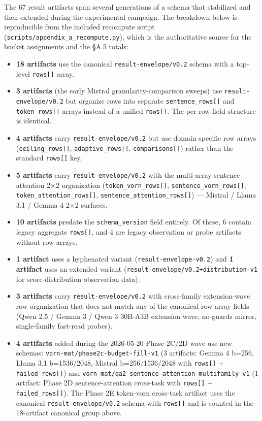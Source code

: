 \documentclass[
]{article}
\providecommand{\tightlist}{%
  \setlength{\itemsep}{0pt}\setlength{\parskip}{0pt}}
\begin{document}
The 67 result artifacts span several generations of a schema that
stabilized and then extended during the experimental campaign. The
breakdown below is reproducible from the included recompute script
(\texttt{scripts/\allowbreak{}appendix\_a\_recompute.\allowbreak{}py}), which is the authoritative
source for the bucket assignments and the §A.5 totals:

\begin{itemize}
\tightlist
\item
  \textbf{18 artifacts} use the canonical \texttt{result-envelope/v0.2}
  schema with a top-level \texttt{rows{[}{]}} array.
\item
  \textbf{3 artifacts} (the early Mistral granularity-comparison sweeps)
  use \texttt{result-envelope/v0.2} but organize rows into separate
  \texttt{sentence\_rows{[}{]}} and \texttt{token\_rows{[}{]}} arrays
  instead of a unified \texttt{rows{[}{]}}. The per-row field structure
  is identical.
\item
  \textbf{4 artifacts} carry \texttt{result-envelope/v0.2} but use
  domain-specific row arrays (\texttt{ceiling\_rows{[}{]}},
  \texttt{adaptive\_rows{[}{]}}, \texttt{comparisons{[}{]}}) rather than
  the standard \texttt{rows{[}{]}} key.
\item
  \textbf{5 artifacts} carry \texttt{result-envelope/v0.2} with the
  multi-array sentence-attention 2×2 organization
  (\texttt{token\_vorn\_rows{[}{]}},
  \texttt{sentence\_vorn\_rows{[}{]}},
  \texttt{token\_attention\_rows{[}{]}},
  \texttt{sentence\_attention\_rows{[}{]}}) --- Mistral / Llama 3.1 /
  Gemma 4 2×2 surfaces.
\item
  \textbf{10 artifacts} predate the \texttt{schema\_version} field
  entirely. Of these, 6 contain legacy aggregate \texttt{rows{[}{]}},
  and 4 are legacy observation or probe artifacts without row arrays.
\item
  \textbf{1 artifact} uses a hyphenated variant
  (\texttt{result-envelope-v0.2}) and \textbf{1 artifact} uses an
  extended variant (\texttt{result-envelope/\allowbreak{}v0.\allowbreak{}2+distribution-v1} for
  score-distribution observation data).
\item
  \textbf{3 artifacts} carry \texttt{result-envelope/v0.2} with
  cross-family extension-wave row organization that does not match any
  of the canonical row-array fields (Qwen 2.5 / Gemma 3 / Qwen 3 30B-A3B
  extension wave, no-guards mirror, single-family fast-read probes).
\item
  \textbf{4 artifacts} added during the 2026-05-20 Phase 2C/2D wave use
  new schemas: \texttt{vorn-mat/\allowbreak{}phase2c-budget-fill-v1} (3 artifacts:
  Gemma 4 b=256, Llama 3.1 b=1536/2048, Mistral b=256/1536/2048 with
  \texttt{rows{[}{]}} + \texttt{failed\_rows{[}{]}}) and
  \texttt{vorn-mat/\allowbreak{}qa2-sentence-attention-multifamily-v1} (1 artifact:
  Phase 2D sentence-attention cross-task with \texttt{rows{[}{]}} +
  \texttt{failed\_rows{[}{]}}). The Phase 2E token-vorn cross-task
  artifact uses the canonical \texttt{result-envelope/v0.2} schema with
  \texttt{rows{[}{]}} and is counted in the 18-artifact canonical group
  above.
\end{itemize}
\end{document}
